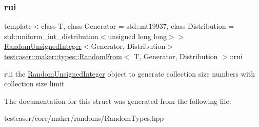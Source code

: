 \subsubsection{\texorpdfstring{rui}{rui}}
{\footnotesize\ttfamily template$<$class T, class Generator = std\+::mt19937, class Distribution = std\+::uniform\+\_\+int\+\_\+distribution$<$unsigned long long$>$$>$ \\
\mbox{\hyperlink{classtestcaser_1_1maker_1_1types_1_1RandomUnsignedInteger}{Random\+Unsigned\+Integer}}$<$Generator, Distribution$>$ \mbox{\hyperlink{structtestcaser_1_1maker_1_1types_1_1RandomFrom}{testcaser\+::maker\+::types\+::\+Random\+From}}$<$ T, Generator, Distribution $>$\+::rui}



rui the \mbox{\hyperlink{classtestcaser_1_1maker_1_1types_1_1RandomUnsignedInteger}{Random\+Unsigned\+Integer}} object to generate collection size numbers with collection size limit 



The documentation for this struct was generated from the following file\+:\begin{DoxyCompactItemize}
\item 
testcaser/core/maker/randoms/Random\+Types.\+hpp\end{DoxyCompactItemize}

